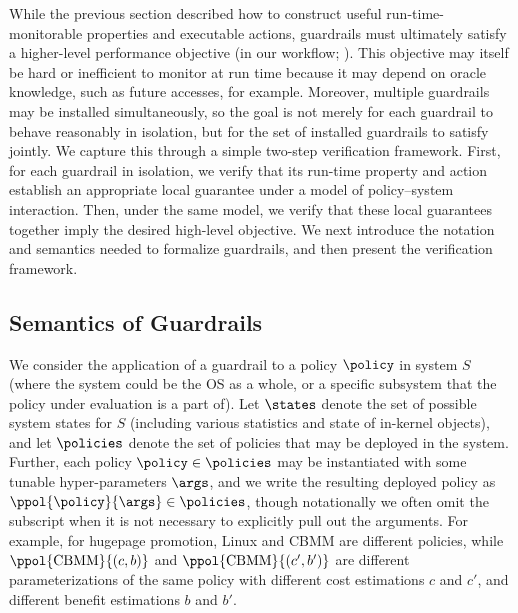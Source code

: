 
While the previous section described how to construct useful run-time-monitorable properties and executable actions, guardrails must ultimately satisfy a higher-level performance objective (\perfsafety in our workflow; ). This objective may itself be hard or inefficient to monitor at run time because it may depend on oracle knowledge, such as future accesses, for example. Moreover, multiple guardrails may be installed simultaneously, so the goal is not merely for each guardrail to behave reasonably in isolation, but for the set of installed guardrails to satisfy \perfsafety jointly. We capture this through a simple two-step verification framework. First, for each guardrail in isolation, we verify that its run-time property and action establish an appropriate local guarantee under a model of policy--system interaction. Then, under the same model, we verify that these local guarantees together imply the desired high-level objective. We next introduce the notation and semantics needed to formalize guardrails, and then present the verification framework.



\subsection{Semantics of Guardrails}
\label{subsec:semantics}

We consider the application of a guardrail to a policy $\policy$ in system $S$ (where the system could be the OS as a whole, or a specific subsystem that the policy under evaluation is a part of).
Let $\states$ denote the set of possible system states for $S$ (including various statistics and state of in-kernel objects), and let $\policies$ denote the set of policies that may be deployed in the system.
Further, each policy $\policy \in \policies$ may be instantiated with some tunable hyper-parameters $\args$, and we write the resulting deployed policy as $\ppol{\policy}{\args} \in \policies$,  though notationally we often omit the subscript when it is not necessary to explicitly pull out the arguments.
For example, for hugepage promotion, Linux and CBMM are different policies, while $\ppol{\mathrm{CBMM}}{(c,b)}$ and $\ppol{\mathrm{CBMM}}{(c',b')}$  are different parameterizations of the same policy with different cost estimations $c$ and $c'$, and different benefit estimations $b$ and $b'$.

